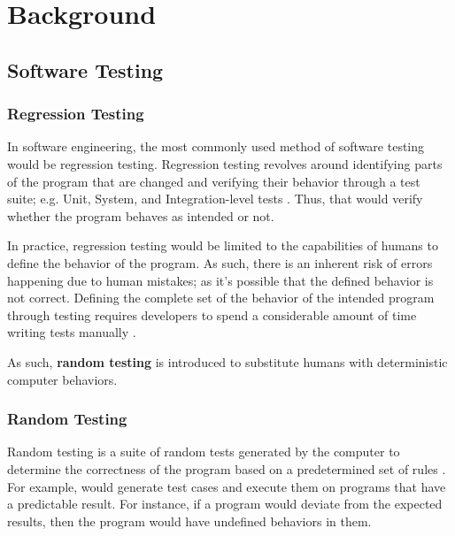 \section{Background}
%

\subsection{Software Testing}

\subsubsection{Regression Testing}

In software engineering, the most commonly used method of software testing would be regression testing. Regression testing revolves around 
identifying parts of the program that are changed and verifying their behavior through a test suite; e.g. Unit, System, and Integration-level tests
\cite{testing}. Thus, that would verify whether the program behaves as intended or not.

In practice, regression testing would be limited to the capabilities of humans to define the behavior of the program. As such, there is an inherent 
risk of errors happening due to human mistakes; as it's possible that the defined behavior is not correct. Defining the complete set of the behavior 
of the intended program through testing requires developers to spend a considerable amount of time writing tests manually \cite{differentialTesting}. 

As such, \textbf{random testing} is introduced to substitute humans with deterministic computer behaviors.

\subsubsection{Random Testing}

Random testing is a suite of random tests generated by the computer to determine the correctness of the program based on a predetermined 
set of rules \cite{differentialTesting}. For example, \cite[Sec. 2]{randomTesting} would generate test cases and 
execute them on programs that have a predictable result. For instance, if a program would deviate from the expected results, then the 
program would have undefined behaviors in them.


